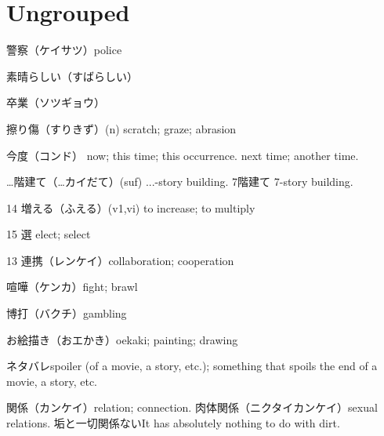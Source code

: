 \section{Ungrouped}

警察（ケイサツ）police

素晴らしい（すばらしい）

卒業（ソツギョウ）

擦り傷（すりきず）(n) scratch; graze; abrasion

今度（コンド）
now; this time; this occurrence.
next time; another time.

…階建て（…カイだて）(suf) ...-story building.
7階建て 7-story building.

14 増える（ふえる）(v1,vi) to increase; to multiply

15 選 elect; select

13 連携（レンケイ）collaboration; cooperation

喧嘩（ケンカ）fight; brawl

博打（バクチ）gambling

お絵描き（おエかき）oekaki; painting; drawing

ネタバレspoiler (of a movie, a story, etc.); something that spoils the end of a movie, a story, etc.

関係（カンケイ）relation; connection.
肉体関係（ニクタイカンケイ）sexual relations.
垢と一切関係ないIt has absolutely nothing to do with dirt.
